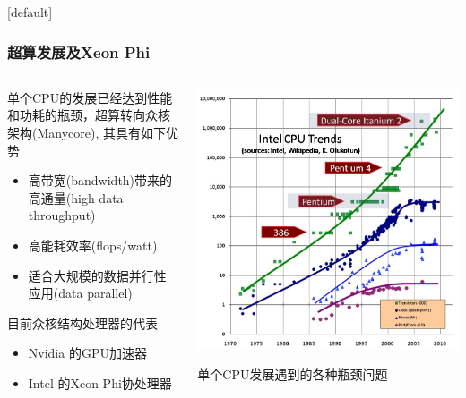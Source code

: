 \documentclass{beamer}
\makeatletter
\newenvironment{withoutheadline}{
  \setbeamertemplate{headline}[default]
  \def\beamer@entrycode{\vspace*{-\headheight}}
}{}
\makeatother
\begin{document}
\begin{withoutheadline}
\begin{frame}
	\frametitle{超算发展及Xeon Phi}
	\begin{columns}
		\begin{column}[T]{0.4\textwidth}
			单个CPU的发展已经达到性能和功耗的瓶颈，超算转向众核架构(Manycore), 其具有如下优势
			\begin{itemize}
				\item 高带宽(bandwidth)带来的高通量(high data throughput)
				\item 高能耗效率(flops/watt)
				\item 适合大规模的数据并行性应用(data parallel)
			\end{itemize}
			目前众核结构处理器的代表
			\begin{itemize}
				\item Nvidia 的GPU加速器
				\item Intel 的Xeon Phi协处理器
			\end{itemize}
		\end{column}\hfill
		\begin{column}[T]{0.6\textwidth}
			\includegraphics[width=\textwidth]{Figures/context/CPU-Scaling.jpg}
			\begin{center}
				\scriptsize
				单个CPU发展遇到的各种瓶颈问题
			\end{center}
		\end{column}
	\end{columns}
\end{frame}
\end{withoutheadline}
\end{document}
